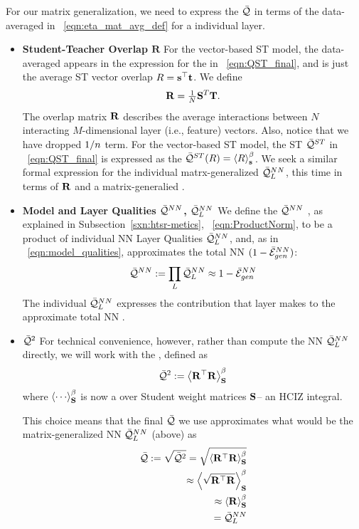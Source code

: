 For our matrix generalization, we need to express the \LayerQuality $\bar{\mathcal{Q}}$ in terms of the data-averaged
\SelfOverlap in \EQN~\ref{eqn:eta_mat_avg_def} for a individual layer.
\begin{itemize}
\item
\textbf{Student-Teacher Overlap  $\mathbf{R}$}
For the vector-based \Perceptron ST model, the data-averaged \SelfOverlap appears in the expression for the
\LayerQuality  in \EQN~\ref{eqn:QST_final}, and is just the average ST vector overlap $R={\mathbf{s}}^{\top}{\mathbf{t}}$. 
We define 
\begin{equation}
\mathbf{R} =  \tfrac{1}{N}{\mathbf{S}}^{T} {\mathbf{T}}  .
\end{equation}
The overlap matrix $\mathbf{R}$ describes the average interactions between $N$ interacting $M$-dimensional layer (i.e., feature) vectors.  Also, notice that we have dropped $1/n$ term.
For the vector-based ST model, the ST \Quality $\bar{\mathcal{Q}}^{ST}$ in \EQN~\ref{eqn:QST_final} is expressed as
the \ThermalAverage $\bar{\mathcal{Q}}^{ST}(R)=\left\langle R \right\rangle_{\mathbf s}^{\beta}$. We seek a similar formal expression for the individual matrx-generalized \LayerQuality $\bar{\mathcal{Q}}^{NN}_{L}$, this time in terms of $\mathbf{R}$ and a matrix-generalied \ThermalAverage.
\item
\textbf{Model and Layer Qualities $\bar{\mathcal{Q}}^{NN}$, $\bar{\mathcal{Q}}^{NN}_{L}$}
We define the \ModelQuality $\bar{\mathcal{Q}}^{NN}$ ,
as explained in Subsection~\ref{sxn:htsr-metics}, \EQN~\ref{eqn:ProductNorm},
to be a product of individual NN Layer Qualities $\bar{\mathcal{Q}}^{NN}_{L}$,
and, as in \EQN~\ref{eqn:model_qualities},
approximates the total NN \AverageGeneralizationAccuracy $(1-\bar{\mathcal{E}}_{gen}^{NN})$:
\begin{equation}
 \bar{\mathcal{Q}}^{NN}:=\prod_{L}\bar{\mathcal{Q}}^{NN}_{L}\approx 1-\bar{\mathcal{E}}_{gen}^{NN} 
\end{equation}
The individual $\bar{\mathcal{Q}}^{NN}_{L}$ expresses the contribution that layer makes
to the approximate total NN \AverageGeneralizationAccuracy.
\item
 \textbf{\LayerQualitySquared $\bar{\mathcal{Q}}^{2}$}
For  technical convenience, however, rather than compute
the NN \LayerQuality $\bar{\mathcal{Q}}^{NN}_{L}$ directly, we will work with the \emph{\AverageLayerQualitySquared}, 
defined as
\begin{align}
  \label{eqn:QT_1}
  \bar{\mathcal{Q}}^{2}:=\left\langle {\mathbf{R}}^{\top}\mathbf{R} \right\rangle_{\mathbf S}^{\beta}
\end{align}
where  $\THRMAVGIZ{\cdots}$ is now a \ThermalAverage over Student weight matrices ${\mathbf{S}}$--
an HCIZ integral.

This choice means that the final \LayerQuality $\bar{\mathcal{Q}}$ we use approximates what would be the
matrix-generalized NN \LayerQuality $\bar{\mathcal{Q}}^{NN}_{L}$ (above) as
\begin{align}
  \label{eqn:QT_2}
  \bar{\mathcal{Q}}:=\sqrt{\bar{\mathcal{Q}}^{2}}
  =\sqrt{\left\langle {\mathbf{R}}^{\top}\mathbf{R} \right\rangle_{\mathbf S}^{\beta}} \\ \nonumber
  \approx\left\langle \sqrt{{\mathbf{R}}^{\top}\mathbf{R}} \right\rangle_{\mathbf S}^{\beta} \\ \nonumber
  \approx\left\langle \mathbf{R} \right\rangle_{\mathbf S}^{\beta} \\ \nonumber
  = \bar{\mathcal{Q}}^{NN}_{L}
\end{align}


\end{itemize}
